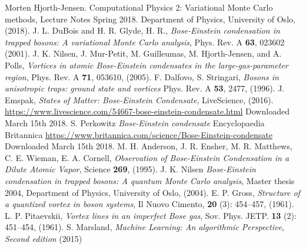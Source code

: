 \documentclass[norsk,a4paper,12pt]{article}
\begin{document}
\begingroup
\renewcommand{\section}[2]{}
\begin{thebibliography}{}
	Morten Hjorth-Jensen.
	Computational Physics 2: Variational Monte Carlo methods, Lecture Notes Spring 2018.
	Department of Physics, University of Oslo,
	(2018).
	J. L. DuBois and H. R. Glyde, H. R., \emph{Bose-Einstein condensation in trapped bosons: A variational Monte Carlo analysis}, Phys. Rev. A \textbf{63}, 023602 (2001).
	J. K. Nilsen,  J. Mur-Petit, M. Guilleumas, M. Hjorth-Jensen, and A. Polls, \emph{Vortices in atomic Bose-Einstein condensates in the large-gas-parameter region}, Phys. Rev. A \textbf{71}, 053610, (2005).
	F. Dalfovo, S. Stringari, \emph{Bosons in anisotropic traps: ground state and vortices} Phys. Rev. A \textbf{53}, 2477, (1996).
	J. Emspak, \emph{States of Matter: Bose-Einstein Condensate}, LiveScience, (2016).
	\url{https://www.livescience.com/54667-bose-einstein-condensate.html}
	Downloaded March 15th 2018.
	S. Perkowitz \emph{Bose-Einstein condensate} Encyclopaedia Britannica 
	\url{https://www.britannica.com/science/Bose-Einstein-condensate}
	Downloaded March 15th 2018.
	M. H. Anderson, J. R. Ensher, M. R. Matthews, C. E. Wieman, E. A. Cornell, \emph{Observation of Bose-Einstein Condensation in a Dilute Atomic Vapor}, Science \textbf{269}, (1995).
	J. K. Nilsen \emph{Bose-Einstein condensation in trapped bosons: A quantum Monte Carlo analysis}, Master thesis 2004, Department of Physics, University of Oslo, (2004). 
	E. P. Gross, \emph{Structure of a quantized vortex in boson systems}, Il Nuovo Cimento, \textbf{20} (3): 454–457, (1961).
	L. P. Pitaevskii, \emph{Vortex lines in an imperfect Bose gas}, Sov. Phys. JETP. \textbf{13} (2): 451–454, (1961).
	S. Marsland, \emph{Machine Learning: An algorithmic Perspective, Second edition} (2015)
	
	
\end{thebibliography}
\endgroup
\end{document}
